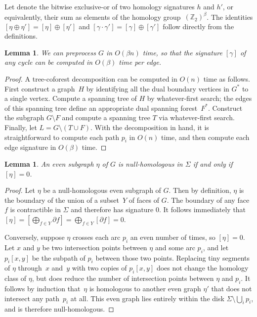 \documentclass[11pt,twoside]{article}
\def\Z{\mathbb{Z}}
\let\cycle\gamma
\def\dualarc{p}
\newtheorem{lemma}[theorem]{Lemma}
\begin{document}
Let  denote the bitwise exclusive-or of two homology signatures $h$ and $h'$, or equivalently, their sum as elements of the homology group~$(\Z_2)^\beta$.  The identities $[\eta \oplus \eta'] = [\eta] \oplus [\eta']$ and $[\cycle\cdot\cycle'] = [\cycle] \oplus [\cycle']$ follow directly from the definitions.

\begin{lemma}
\label{lem:sign}
We can preprocess $G$ in $O(\beta n)$ time, so that the signature $[\cycle]$ of any cycle can be computed in $O(\beta)$ time per edge.
\end{lemma}

\begin{proof}
A tree-coforest decomposition can be computed in $O(n)$ time as follows.  First construct a graph~$H$ by identifying all the dual boundary vertices in $G^*$ to a single vertex.  Compute a spanning tree of $H$ by whatever-first search; the edges of this spanning tree define an appropriate dual spanning forest~$F^*$.  Construct the subgraph $G\setminus F$ and compute a spanning tree $T$ via whatever-first search.  Finally, let $L = G\setminus (T\cup F)$.  With the decomposition in hand, it is straightforward to compute each path $\dualarc_i$ in $O(n)$ time, and then compute each edge signature in $O(\beta)$ time.
\end{proof}

\begin{lemma}
An even subgraph $\eta$ of $G$ is null-homologous in $\Sigma$ if and only if $[\eta] = 0$.
\end{lemma}

\begin{proof}
Let $\eta$ be a null-homologous even subgraph of $G$.  Then by definition, $\eta$ is the boundary of the union of a subset~$Y$ of faces of $G$.  The boundary of any face $f$ is contractible in $\Sigma$ and therefore has signature $0$.  It follows immediately that $[\eta] = [\bigoplus_{f\in Y} \partial f] = \bigoplus_{f\in Y} [\partial f] = 0$.

Conversely, suppose $\eta$ crosses each arc $\dualarc_i$ an even number of times, so $[\eta]=0$.  Let $x$ and $y$ be two intersection points between $\eta$ and some arc $\dualarc_i$, and let $\dualarc_i[x,y]$ be the subpath of $\dualarc_i$ between those two points.  Replacing tiny segments of $\eta$ through~$x$ and~$y$ with two copies of $\dualarc_i[x,y]$ does not change the homology class of $\eta$, but does reduce the number of intersection points between $\eta$ and $\dualarc_i$.  It follows by induction that~$\eta$ is homologous to another even graph $\eta'$ that does not intersect any path~$\dualarc_i$ at all.  This even graph lies entirely within the disk $\Sigma\setminus \bigcup_i\dualarc_i$, and is therefore null-homologous.
\end{proof}
\end{document}
